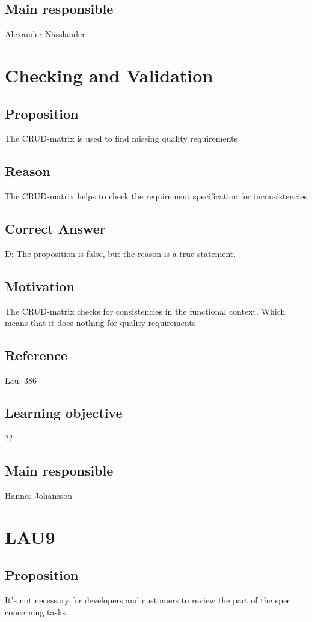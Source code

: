 \documentclass[a4paper]{article}
\begin{document}
\subsection*{Main responsible}
Alexander Nässlander



\section{Checking and Validation}
\subsection*{Proposition}
The CRUD-matrix is used to find missing quality requirements

\subsection*{Reason}
The CRUD-matrix helps to check the requirement specification for inconsistencies 
\subsection*{Correct Answer}
D: The proposition is false, but the reason is a true statement.
\subsection*{Motivation}
The CRUD-matrix checks for consistencies in the functional context. Which means that it does nothing for quality requirements
\subsection*{Reference}
Lau: 386
\subsection*{Learning objective}
??
\subsection*{Main responsible}
Hannes Johansson

\section{LAU9}
\subsection*{Proposition}
It’s not necessary for developers and customers to review the part of the spec concerning tasks.
\end{document}
